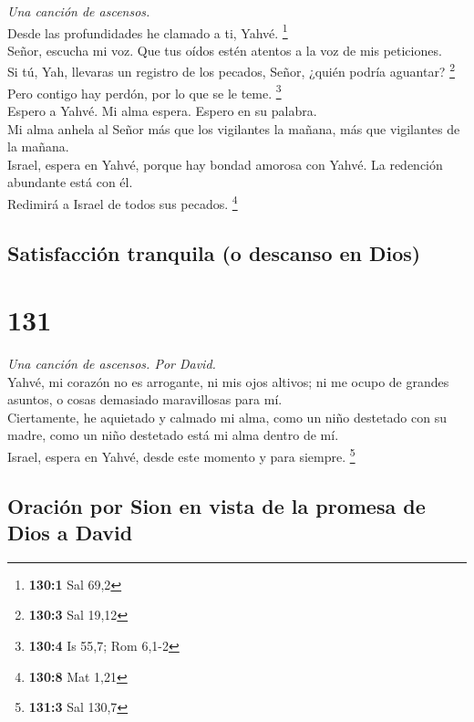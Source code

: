 \emph{Una canción de ascensos.}\\
 Desde las profundidades he clamado a ti, Yahvé.
\footnote{\textbf{130:1} Sal 69,2}\\
 Señor, escucha mi voz. Que tus oídos estén atentos a la
voz de mis peticiones.\\
 Si tú, Yah, llevaras un registro de los pecados, Señor,
¿quién podría aguantar? \footnote{\textbf{130:3} Sal 19,12}\\
 Pero contigo hay perdón, por lo que se le teme.
\footnote{\textbf{130:4} Is 55,7; Rom 6,1-2}\\
 Espero a Yahvé. Mi alma espera. Espero en su palabra.\\
 Mi alma anhela al Señor más que los vigilantes la mañana,
más que vigilantes de la mañana.\\
 Israel, espera en Yahvé, porque hay bondad amorosa con
Yahvé. La redención abundante está con él.\\
 Redimirá a Israel de todos sus pecados. \footnote{\textbf{130:8}
  Mat 1,21}

\hypertarget{satisfacciuxf3n-tranquila-o-descanso-en-dios}{%
\subsection{Satisfacción tranquila (o descanso en
Dios)}\label{satisfacciuxf3n-tranquila-o-descanso-en-dios}}

\hypertarget{section-128}{%
\section{131}\label{section-128}}

\emph{Una canción de ascensos. Por David.}\\
 Yahvé, mi corazón no es arrogante, ni mis ojos altivos;
ni me ocupo de grandes asuntos, o cosas demasiado maravillosas para
mí.\\
 Ciertamente, he aquietado y calmado mi alma, como un niño
destetado con su madre, como un niño destetado está mi alma dentro de
mí.\\
 Israel, espera en Yahvé, desde este momento y para
siempre. \footnote{\textbf{131:3} Sal 130,7}

\hypertarget{oraciuxf3n-por-sion-en-vista-de-la-promesa-de-dios-a-david}{%
\subsection{Oración por Sion en vista de la promesa de Dios a
David}\label{oraciuxf3n-por-sion-en-vista-de-la-promesa-de-dios-a-david}}

